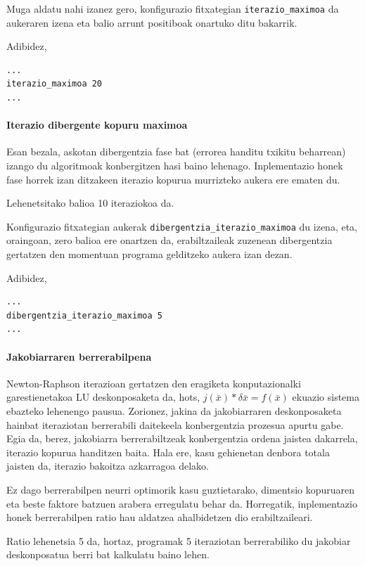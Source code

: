 \documentclass[10pt,a4paper,basque]{article}
\begin{document}
Muga aldatu nahi izanez gero, konfigurazio fitxategian \verb|iterazio_maximoa| da aukeraren izena eta balio arrunt positiboak onartuko ditu bakarrik.

Adibidez,

\begin{lstlisting}
...
iterazio_maximoa 20
...
\end{lstlisting}

\paragraph{Iterazio dibergente kopuru maximoa}
Esan bezala, askotan dibergentzia fase bat (errorea handitu txikitu beharrean) izango du algoritmoak konbergitzen hasi baino lehenago. Inplementazio honek fase horrek izan ditzakeen iterazio kopurua murrizteko aukera ere ematen du.

Lehenetsitako balioa 10 iteraziokoa da.

Konfigurazio fitxategian aukerak \verb|dibergentzia_iterazio_maximoa| du izena, eta, oraingoan, zero balioa ere onartzen da, erabiltzaileak zuzenean dibergentzia gertatzen den momentuan programa gelditzeko aukera izan dezan.

Adibidez,

\begin{lstlisting}
...
dibergentzia_iterazio_maximoa 5
...
\end{lstlisting}

\paragraph{Jakobiarraren berrerabilpena}
Newton-Raphson iterazioan gertatzen den eragiketa konputazionalki garestienetakoa LU deskonposaketa da, hots, $j(\bar{x}) * \delta \bar{x} = f(\bar{x})$ ekuazio sistema ebazteko lehenengo pausua. Zorionez, jakina da jakobiarraren deskonposaketa hainbat iteraziotan berrerabili daitekeela konbergentzia prozesua apurtu gabe. Egia da, berez, jakobiarra berrerabiltzeak konbergentzia ordena jaistea dakarrela, iterazio kopurua handitzen baita. Hala ere, kasu gehienetan denbora totala jaisten da, iterazio bakoitza azkarragoa delako.

Ez dago berrerabilpen neurri optimorik kasu guztietarako, dimentsio kopuruaren eta beste faktore batzuen arabera erregulatu behar da. Horregatik, inplementazio honek berrerabilpen ratio hau aldatzea ahalbidetzen dio erabiltzaileari.

Ratio lehenetsia 5 da, hortaz, programak 5 iteraziotan berrerabiliko du jakobiar deskonposatua berri bat kalkulatu baino lehen.
\end{document}
